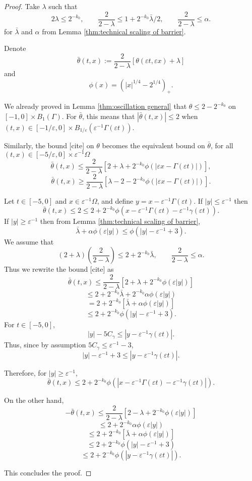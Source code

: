 \documentclass[11pt]{amsart}
\theoremstyle{remark}
\theoremstyle{definition}
\newcommand{\eps}{\varepsilon}
\newcommand{\paren}[1]{\left( #1 \right)}
\newcommand{\bracket}[1]{\left[ #1 \right]}
\newcommand{\n}{^{-1}}
\begin{document}
\begin{proof}
Take $\lambda$ such that
\[ 2\lambda \leq 2^{-k_0}, \qquad \frac{2}{2-\lambda} \leq 1 + 2^{-k_0} \bar{\lambda} / 2, \qquad \frac{2}{2-\lambda} \leq \alpha. \]
for $\bar{\lambda}$ and $\alpha$ from Lemma \ref{thm:technical scaling of barrier}.  

Denote 
\[ \bar{\theta}(t,x) := \frac{2}{2-\lambda} \bracket{\theta(\eps t, \eps x) + \lambda} \]
and
\[ \phi(x) = \paren{|x|^{1/4} - 2^{1/4}}_+. \]

We already proved in Lemma \ref{thm:oscillation general} that $\theta \leq 2 - 2^{-k_0}$ on $[-1,0] \times B_1(\Gamma)$.  For $\bar{\theta}$, this means that $|\bar{\theta}(t,x)| \leq 2$ when $(t,x) \in [-1/\eps, 0] \times B_{1/\eps}(\eps\n \Gamma(\eps t))$.  

Similarly, the bound [cite] on $\theta$ becomes the equivalent bound on $\bar{\theta}$, for all $(t,x) \in [-5/\eps,0] \times \eps\n \Omega$
\[ \bar{\theta}(t,x) \leq \frac{2}{2-\lambda} \bracket{2 + \lambda + 2^{-k_0} \phi(|\eps x - \Gamma(\eps t)|)}, \]
\[ \bar{\theta}(t,x) \geq \frac{2}{2-\lambda} \bracket{\lambda - 2 - 2^{-k_0} \phi(|\eps x - \Gamma(\eps t)|)}. \]

Let $t \in [-5,0]$ and $x \in \eps\n \Omega$, and define $y = x - \eps\n \Gamma(\eps t)$.  If $|y| \leq \eps\n$ then
\[ \bar{\theta}(t,x) \leq 2 \leq 2 + 2^{-k_0} \phi(x - \eps\n \Gamma(\eps t) - \eps\n \gamma(\eps t)). \]
If $|y| \geq \eps\n$ then from Lemma \ref{thm:technical scaling of barrier}, 
\[ \bar{\lambda} + \alpha \phi(\eps |y|) \leq \phi(|y| - \eps\n + 3). \]
We assume that
\[ (2+\lambda)(\frac{2}{2-\lambda}) \leq 2 + 2^{-k_0} \bar{\lambda}, \qquad \frac{2}{2-\lambda} \leq \alpha. \]
Thus we rewrite the bound [cite] as
\[ \bar{\theta}(t,x) \leq \frac{2}{2-\lambda} \bracket{2 + \lambda + 2^{-k_0} \phi(\eps |y|)} \]
\[ \leq 2 + 2^{-k_0} \bar{\lambda} + 2^{-k_0} \alpha \phi(\eps |y|) \]
\[ = 2 + 2^{-k_0} \bracket{\bar{\lambda} + \alpha \phi(\eps |y|)} \]
\[ \leq 2 + 2^{-k_0} \phi(|y| - \eps\n + 3). \]
For $t \in [-5,0]$,
\[ |y| - 5 C_\gamma \leq |y - \eps\n\gamma(\eps t)|. \]
Thus, since by assumption $5 C_\gamma \leq \eps\n - 3$,
\[ |y| - \eps\n + 3 \leq |y-\eps\n\gamma(\eps t)|. \]

Therefore, for $|y| \geq \eps\n$,
\[ \bar{\theta}(t,x) \leq 2 + 2^{-k_0} \phi(|x - \eps\n\Gamma(\eps t) - \eps\n\gamma(\eps t)|). \]

On the other hand, 
\[ -\bar{\theta}(t,x) \leq \frac{2}{2-\lambda} \bracket{2 -\lambda + 2^{-k_0} \phi(\eps |y|)} \]
\[ \leq 2 + 2^{-k_0} \alpha \phi(\eps |y|) \]
\[ \leq 2 + 2^{-k_0} \bracket{\bar{\lambda} + \alpha \phi(\eps |y|)} \]
\[ \leq 2 + 2^{-k_0} \phi(|y| - \eps\n + 3) \]
\[ \leq 2 + 2^{-k_0} \phi(|y-\eps\n\gamma(\eps t)|). \]

This concludes the proof.  
\end{proof}
\end{document}
